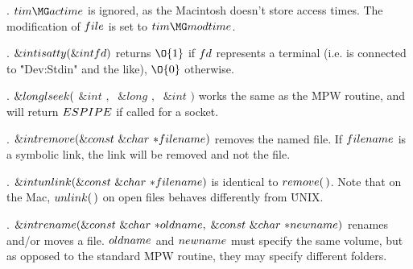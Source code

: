 . \CD{}$\\{tim}\MG\\{actime}$\DC{} is ignored, as the Macintosh doesn't
store access times. The modification
of \CD{}$\\{file}$\DC{} is set to \CD{}$\\{tim}\MG\\{modtime}$\DC{}.

\fi

. \CD{}$\&{int}\ \\{isatty}(\&{int}\ \\{fd})$\DC{} returns \CD{}$\O{1}$%
\DC{} if \CD{}$\\{fd}$\DC{} represents a terminal (i.e. is connected
to \.{"Dev:Stdin"} and the like), \CD{}$\O{0}$\DC{} otherwise.

\fi

. \CD{}$\&{long}\ \\{lseek}($ $\&{int}$ $,\;$ $\&{long}$ $,\;$ $\&{int}$
$)$\DC{} works the same as the \.{MPW} routine, and will
return \CD{}$\\{ESPIPE}$\DC{} if called for a socket.

\fi

. \CD{}$\&{int}\ \\{remove}(\&{const}\ \&{char}\ {*}\\{filename})$\DC{}
removes the named file. If \CD{}$\\{filename}$\DC{} is a
symbolic link, the link will be removed and not the file.

\fi

. \CD{}$\&{int}\ \\{unlink}(\&{const}\ \&{char}\ {*}\\{filename})$\DC{} is
identical to \CD{}$\\{remove}(\,)$\DC{}. Note that
on the Mac, \CD{}$\\{unlink}(\,)$\DC{} on open files behaves differently from %
\.{UNIX}.

\fi

. \CD{}$\&{int}\ \\{rename}(\&{const}\ \&{char}\ {*}\\{oldname},\;\&{const}%
\ \&{char}\ {*}\\{newname})$\DC{} renames and/or moves a
file. \CD{}$\\{oldname}$\DC{} and \CD{}$\\{newname}$\DC{} must specify the same
volume, but as opposed to
the standard \.{MPW} routine, they may specify different folders.


